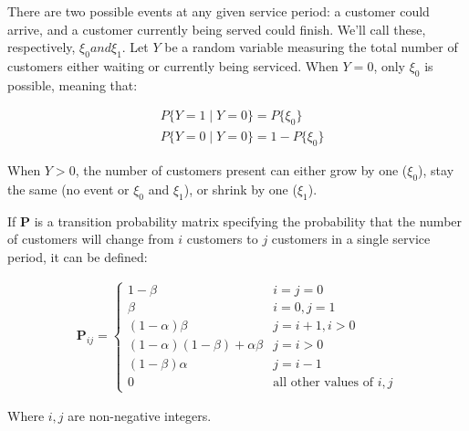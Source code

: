 
There are two possible events at any given service period: a customer could
arrive, and a customer currently being served could finish. We'll call
these, respectively, $\xi_0 and \xi_1$. Let $Y$ be a random variable
measuring the total number of customers either waiting or currently
being serviced. When $Y=0$, only $\xi_0$ is possible, meaning that:

\begin{align*}
    &P\lbrace Y = 1 \mid Y = 0\rbrace = P\lbrace\xi_0\rbrace \\
    &P\lbrace Y = 0 \mid Y = 0\rbrace = 1 - P\lbrace\xi_0\rbrace
\end{align*}

When $Y > 0$, the number of customers present can either grow by one
($\xi_0$), stay the same (no event or $\xi_0$ and $\xi_1$), or shrink by
one ($\xi_1$).

If \textbf{P} is a transition probability matrix specifying the
probability that the number of customers will change from $i$ customers
to $j$ customers in a single service period, it can be defined:

\begin{align*}
    \textbf{P}_{ij} = 
    \begin{cases}
        1 - \beta & i = j = 0 \\
        \beta & i = 0, j = 1 \\
        (1 - \alpha)\beta & j = i+1, i > 0\\
        (1 - \alpha)(1-\beta) + \alpha\beta & j=i>0\\
        (1 - \beta)\alpha & j = i - 1\\
        0 & \text{all other values of }i, j
    \end{cases}
\end{align*}

Where $i,j$ are non-negative integers.
